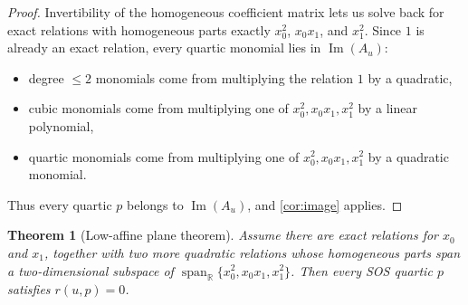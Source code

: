\documentclass[10pt]{article}
\newtheorem{theorem}{Theorem}[section]
\theoremstyle{definition}
\newcommand{\R}{\mathbb{R}}
\newcommand{\HomQ}{\operatorname{span}_{\R}\{x_0^2,x_0x_1,x_1^2\}}
\DeclareMathOperator{\imag}{Im}
\newcommand{\im}{\imag}
\begin{document}
\begin{proof}
Invertibility of the homogeneous coefficient matrix lets us solve back for
exact relations with homogeneous parts exactly \(x_0^2\), \(x_0x_1\), and
\(x_1^2\). Since \(1\) is already an exact relation, every quartic monomial
lies in \(\im(A_u)\):
\begin{itemize}
\item degree \(\le 2\) monomials come from multiplying the relation \(1\) by a
quadratic,
\item cubic monomials come from multiplying one of \(x_0^2,x_0x_1,x_1^2\) by a
linear polynomial,
\item quartic monomials come from multiplying one of \(x_0^2,x_0x_1,x_1^2\) by
a quadratic monomial.
\end{itemize}
Thus every quartic \(p\) belongs to \(\im(A_u)\), and \cref{cor:image} applies.
\end{proof}

\begin{theorem}[Low-affine plane theorem]
\label{thm:low-affine}
Assume there are exact relations for \(x_0\) and \(x_1\), together with two
more quadratic relations whose homogeneous parts span a two-dimensional
subspace of \(\HomQ\). Then every SOS quartic \(p\) satisfies \(r(u,p)=0\).
\end{theorem}
\end{document}
